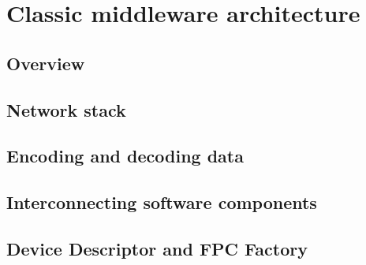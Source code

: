 \chapter{Classic middleware architecture}

\section{Overview}

\section{Network stack}

\section{Encoding and decoding data}

\section{Interconnecting software components}

\section{Device Descriptor and FPC Factory}
